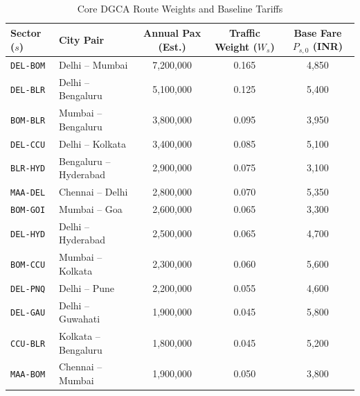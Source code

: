 \documentclass[11pt,a4paper]{article}
\begin{document}
\begin{table}[htbp]
\centering
\caption{Core DGCA Route Weights and Baseline Tariffs}
\label{tab:dgca_routes}
\begin{tabular}{llccc}
\toprule
\textbf{Sector ($s$)} & \textbf{City Pair} & \textbf{Annual Pax (Est.)} & \textbf{Traffic Weight ($W_s$)} & \textbf{Base Fare $P_{s,0}$ (INR)} \\
\midrule
\texttt{DEL-BOM} & Delhi -- Mumbai       & 7,200,000 & 0.165 & 4,850 \\
\texttt{DEL-BLR} & Delhi -- Bengaluru    & 5,100,000 & 0.125 & 5,400 \\
\texttt{BOM-BLR} & Mumbai -- Bengaluru   & 3,800,000 & 0.095 & 3,950 \\
\texttt{DEL-CCU} & Delhi -- Kolkata      & 3,400,000 & 0.085 & 5,100 \\
\texttt{BLR-HYD} & Bengaluru -- Hyderabad & 2,900,000 & 0.075 & 3,100 \\
\texttt{MAA-DEL} & Chennai -- Delhi      & 2,800,000 & 0.070 & 5,350 \\
\texttt{BOM-GOI} & Mumbai -- Goa         & 2,600,000 & 0.065 & 3,300 \\
\texttt{DEL-HYD} & Delhi -- Hyderabad    & 2,500,000 & 0.065 & 4,700 \\
\texttt{BOM-CCU} & Mumbai -- Kolkata     & 2,300,000 & 0.060 & 5,600 \\
\texttt{DEL-PNQ} & Delhi -- Pune         & 2,200,000 & 0.055 & 4,600 \\
\texttt{DEL-GAU} & Delhi -- Guwahati     & 1,900,000 & 0.045 & 5,800 \\
\texttt{CCU-BLR} & Kolkata -- Bengaluru  & 1,800,000 & 0.045 & 5,200 \\
\texttt{MAA-BOM} & Chennai -- Mumbai     & 1,900,000 & 0.050 & 3,800 \\
\bottomrule
\end{tabular}
\end{table}
\end{document}

